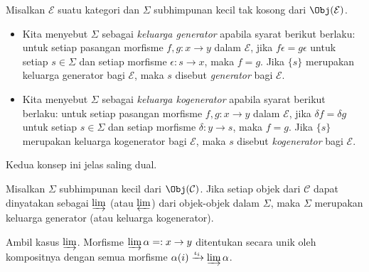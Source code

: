 \begin{definisi}\label{def:generators}
	Misalkan $\mathcal{E}$ suatu kategori dan $\Sigma$ subhimpunan kecil tak
	kosong dari $\Obj(\mathcal{E})$.
	\begin{itemize}
		\item Kita menyebut $\Sigma$ sebagai \emph{keluarga generator} apabila
		syarat berikut berlaku: untuk setiap pasangan morfisme
		$f,g:x\to y$ dalam $\mathcal{E}$, jika
		$f\epsilon=g\epsilon$ untuk setiap $s\in\Sigma$ dan setiap morfisme
		$\epsilon:s\to x$, maka $f=g$. Jika $\{s\}$ merupakan keluarga
		generator bagi $\mathcal{E}$, maka $s$ disebut \emph{generator} bagi
		$\mathcal{E}$.
		\item Kita menyebut $\Sigma$ sebagai \emph{keluarga kogenerator}
		apabila syarat berikut berlaku: untuk setiap pasangan morfisme
		$f,g:x\to y$ dalam $\mathcal{E}$, jika $\delta f=\delta g$ untuk
		setiap $s\in\Sigma$ dan setiap morfisme $\delta:y\to s$, maka $f=g$.
		Jika $\{s\}$ merupakan keluarga kogenerator bagi $\mathcal{E}$, maka
		$s$ disebut \emph{kogenerator} bagi $\mathcal{E}$.
	\end{itemize}
\end{definisi}

Kedua konsep ini jelas saling dual.

\begin{lema}\label{prop:generator-via-limit}
	Misalkan $\Sigma$ subhimpunan kecil dari $\Obj(\mathcal{C})$. Jika setiap
	objek dari $\mathcal{C}$ dapat dinyatakan sebagai $\varinjlim$ (atau
	$\varprojlim$) dari objek-objek dalam $\Sigma$, maka $\Sigma$ merupakan
	keluarga generator (atau keluarga kogenerator).
\end{lema}
\begin{bukti}
	Ambil kasus $\varinjlim$. Morfisme
	$\varinjlim\alpha=:x\to y$ ditentukan secara unik oleh kompositnya dengan
	semua morfisme
	$\alpha(i)\xrightarrow{\iota_i}\varinjlim\alpha$.
\end{bukti}

